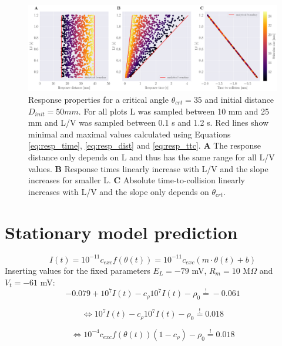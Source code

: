 \documentclass[a4paper,10pt,hidelinks]{scrreprt}
\begin{document}
    \begin{figure}[!h]
    	\begin{center}
			\includegraphics[width=\textwidth]{figure_ideal_resp.pdf}
    	\end{center}
    	\caption{Response properties for a critical angle $\theta_{crt}=35$ and initial distance $D_{init}=50 mm$.  For all plots L was sampled between 10 mm and 25 mm and L/V was sampled between 0.1 s and 1.2 s. Red lines show minimal and maximal values calculated using Equations \ref{eq:resp_time}, \ref{eq:resp_dist} and \ref{eq:resp_ttc}. \textbf{A} The response distance only depends on L and thus has the same range for all L/V values. \textbf{B} Response times linearly increase with L/V and the slope increases for smaller L. \textbf{C} Absolute time-to-collision linearly increases with L/V and the slope only depends on $\theta_{crt}$.}
    	\label{fig:ideal_resp_props}
    \end{figure}
		
	\section{Stationary model prediction}
	\begin{equation}
	I(t) = 10^{-11} c_{exc} f(\theta(t)) = 10^{-11} c_{exc} (m \cdot \theta(t) 
	+ b)
	\end{equation}
	Inserting values for the fixed parameters $E_{L}=-79$ mV, $R_{m}=10$ 
	M$\Omega$ 
	and $V_{t}=-61$ mV:
	\begin{equation}
	-0.079 + 10^{7} I(t) - c_{\rho} 10^{7} I(t) - \rho_{0} \overset{!}{=} -0.061
	\end{equation}
	
	\begin{equation}
	\Leftrightarrow 10^{7} I(t) - c_{\rho} 10^{7} I(t) - \rho_{0} 
	\overset{!}{=} 0.018
	\end{equation}
	
	\begin{equation}
	\Leftrightarrow 10^{-4} c_{exc} f(\theta(t)) (1 - c_{\rho}) - \rho_{0} 
	\overset{!}{=} 0.018
	\end{equation}
	
\end{document}
